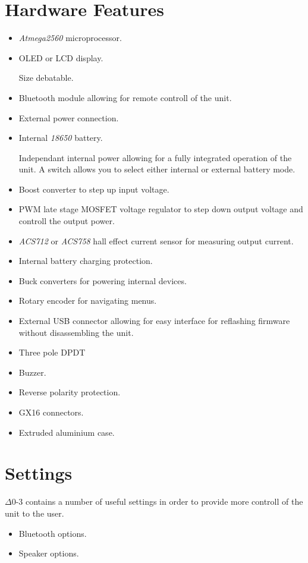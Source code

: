 \documentclass{article}
\begin{document}
\section{Hardware Features}
\begin{itemize}
	\item \textit{Atmega2560} microprocessor.
	\item OLED or LCD display.
	
	Size debatable.
	\item Bluetooth module allowing for remote controll of the unit.
	\item External power connection.
	\item Internal \textit{18650} battery.
	
	Independant internal power allowing for a fully integrated operation of the unit. A switch allows you to select either internal or external 	battery mode.
	\item Boost converter to step up input voltage.
	\item PWM late stage MOSFET voltage regulator to step down output voltage and controll the output power.
	\item \textit{ACS712} or \textit{ACS758} hall effect current sensor for measuring output current.
	\item Internal battery charging protection.
	\item Buck converters for powering internal devices.
	\item Rotary encoder for navigating menus.
	\item External USB connector allowing for easy interface for reflashing firmware without disassembling the unit.
	\item Three pole DPDT
	\item Buzzer.
	\item Reverse polarity protection.
	\item GX16 connectors.
	\item Extruded aluminium case.
\end{itemize}

\section{Settings}
$\Delta$0-3 contains a number of useful settings in order to provide more controll of the unit to the user.

\begin{itemize}
	\item Bluetooth options.
	\item Speaker options.
\end{itemize}
\end{document}
